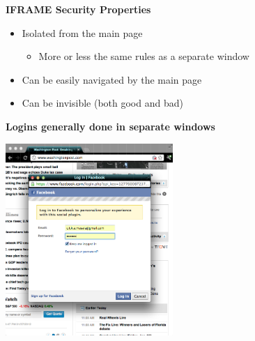 \documentclass[helvetica]{seminar}
\newcommand{\heading}[1]{%
  \begin{center} 
    \large\bf 
    #1 
  \end{center} 
  \vspace{.4 in}}
\begin{document}
\begin{slide}
\heading{IFRAME Security Properties}

\begin{itemize}
\item Isolated from the main page
  \begin{itemize}
  \item More or less the same rules as a separate window
  \end{itemize}

\item Can be easily navigated by the main page
\item Can be invisible (both good and bad)
\end{itemize}
\end{slide}



\begin{slide}

\heading{Logins generally done in separate windows}

\vspace{-.4in}
\begin{center}
\includegraphics[width=2.5in]{fb-login}
\end{center}

\end{slide}
\end{document}
